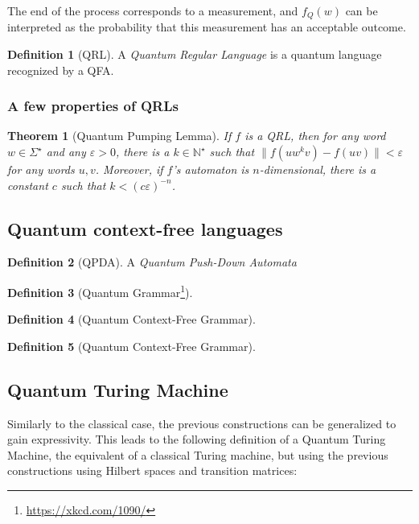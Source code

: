 \documentclass[12pt,a4paper]{article}
\theoremstyle{plain}
\newtheorem*{theorem}{Theorem}
\theoremstyle{definition}
\newtheorem*{definition}{Definition}
\begin{document}
The end of the process corresponds to a measurement, and $f_Q(w)$ can be interpreted as the probability that this measurement has an acceptable outcome. 

\begin{definition}[QRL]
    A \emph{Quantum Regular Language} is a quantum language recognized by a QFA.
\end{definition}

\subsubsection{A few properties of QRLs}
\begin{theorem}[Quantum Pumping Lemma]
    If $f$ is a QRL, then for any word $w\in\Sigma^\star$ and any $\varepsilon > 0$, there is a $k\in \mathbb{N}^\star$ such that $\|f(uw^kv) - f(uv)\| < \varepsilon$ for any words $u, v$. Moreover, if $f$'s automaton is $n$-dimensional, there is a constant $c$ such that $k < (c\varepsilon)^{-n}$.
\end{theorem}

\subsection{Quantum context-free languages}
\begin{definition}[QPDA]
    A \emph{Quantum Push-Down Automata}
\end{definition}

\begin{definition}[Quantum Grammar\footnote{\url{https://xkcd.com/1090/}}]
    
\end{definition}

\begin{definition}[Quantum Context-Free Grammar]
    
\end{definition}

\begin{definition}[Quantum Context-Free Grammar]
    
\end{definition}

\subsection{Quantum Turing Machine}
Similarly to the classical case, the previous constructions can be generalized to gain expressivity. This leads to the following definition of a Quantum Turing Machine\cite{qtm-circuits}\cite{qc-theory-bernstein}, the equivalent of a classical Turing machine, but using the previous constructions using Hilbert spaces and transition matrices:
\end{document}
